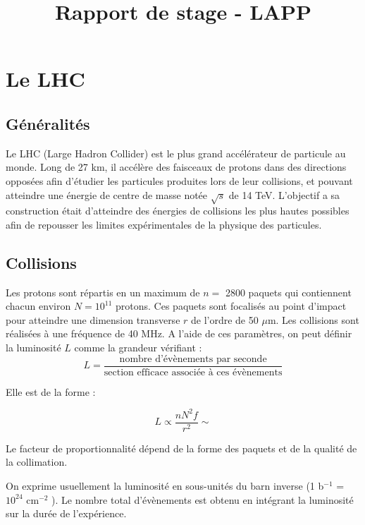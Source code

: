 \documentclass[11pt]{article} %
\title{Rapport de stage - LAPP}
\begin{document}
\maketitle

\tableofcontents

\abstract{  }
 
\section{Le LHC}

\subsection{Généralités}

Le LHC (Large Hadron Collider) est le plus grand accélérateur de particule au monde. Long de 27 km, il accélère des faisceaux de protons dans des directions opposées afin d'étudier les particules produites lors de leur collisions, et pouvant atteindre une énergie de centre de masse notée $\sqrt{s}$ de 14 TeV. L'objectif a sa construction était d'atteindre des énergies de collisions les plus hautes possibles afin de repousser les limites expérimentales de la physique des particules.

\subsection{Collisions}

Les protons sont répartis en un maximum de $n =$ 2800 paquets qui contiennent chacun environ $N = 10^{11}$ protons. Ces paquets sont focalisés au point d'impact pour atteindre une dimension transverse $r$ de l'ordre de 50 $\mu$m. Les collisions sont réalisées à une fréquence de 40 MHz. A l'aide de ces paramètres, on peut définir la luminosité $L$ comme la grandeur vérifiant :
\begin{equation}
L = \dfrac{\mbox{nombre d'évènements par seconde}}{\mbox{section efficace associée à ces évènements}}
\end{equation}

Elle est de la forme :

\begin{equation}
L \propto \dfrac{nN^2f}{r^2} \sim
\end{equation}

Le facteur de proportionnalité dépend de la forme des paquets et de la qualité de la collimation.

On exprime usuellement la luminosité en sous-unités du barn inverse (1 b${}^{-1}$ = $10^{24}$ cm${}^{-2}$ ).
Le nombre total d'évènements est obtenu en intégrant la luminosité sur la durée de l'expérience.
\end{document}
